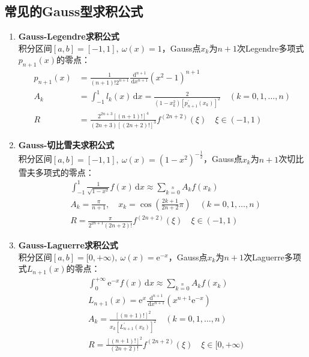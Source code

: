 \subsection*{常见的Gauss型求积公式}
\begin{enumerate}
    \item \textbf{Gauss-Legendre求积公式}\\
        积分区间$[a,b]=[-1,1],\ \omega(x)=1$，Gauss点$x_k$为$n+1$次Legendre多项式$p_{n+1}(x)$的零点：
        \begin{align*}
            p_{n+1}(x) &= \frac{1}{(n+1)!2^{n+1}}\frac{\,\mathrm{d}^{n+1}}{\,\mathrm{d}x^{n+1}}(x^2-1)^{n+1} \\[3mm]
            A_k &= \int_{-1}^1 l_k(x)\,\mathrm{d}x = \frac{2}{(1-x_k^2)[p_{n+1}^{\prime}(x_k)]^2} \quad (k=0,1,\dots,n) \\[3mm]
            R &= \frac{2^{2n+3}[(n+1)!]^4}{(2n+3)[(2n+2)!]^3}f^{(2n+2)}(\xi) \quad \xi \in (-1,1)
        \end{align*}
    \item \textbf{Gauss-切比雪夫求积公式}\\
        积分区间$[a,b]=[-1,1],\ \omega(x)=(1-x^2)^{-\frac{1}{2}}$，Gauss点$x_k$为$n+1$次切比雪夫多项式的零点：
        \begin{align*}
            & \int_{-1}^1 \frac{1}{\sqrt{1-x^2}}f(x)\,\mathrm{d}x \approx \sum\limits_{k=0}\limits^n A_k f(x_k) \\[3mm]
            & A_k = \frac{\pi}{n+1},\quad x_k = \cos(\frac{2k+1}{2n+2}\pi) \quad (k=0,1,\dots,n) \\[3mm]
            & R = \frac{\pi}{2^{2n+1}(2n+2)!}f^{(2n+2)}(\xi) \quad \xi \in (-1,1)
        \end{align*}
    \item \textbf{Gauss-Laguerre求积公式}\\
        积分区间$[a,b]=[0,+\infty),\ \omega(x)=\mathrm{e}^{-x}$，Gauss点$x_k$为$n+1$次Laguerre多项式$L_{n+1}(x)$的零点：
        \begin{align*}
            & \int_0^{+\infty} \mathrm{e}^{-x}f(x)\,\mathrm{d}x \approx \sum\limits_{k=0}\limits^{n}A_k f(x_k) \\[3mm]
            & L_{n+1}(x) = \mathrm{e}^x \frac{\,\mathrm{d}^{n+1}}{\,\mathrm{d}x^{n+1}}(x^{n+1}\mathrm{e}^{-x}) \\[3mm]
            & A_k = \frac{[(n+1)!]^2}{x_k[L_{n+1}^{\prime}(x_k)]^2} \quad (k=0,1,\dots,n) \\[3mm]
            & R = \frac{[(n+1)!]^2}{(2n+2)!}f^{(2n+2)}(\xi) \quad \xi \in [0,+\infty)

\end{align*}
\end{enumerate}
